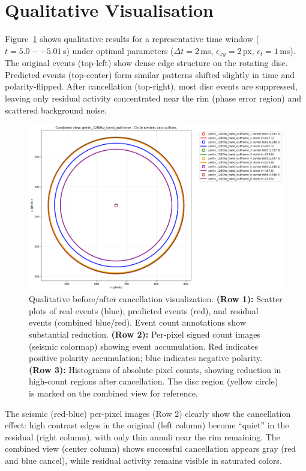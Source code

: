 \section{Qualitative Visualisation}

Figure~\ref{fig:before_after} shows qualitative results for a representative time window ($t=5.0--5.01$\,s) under optimal parameters ($\Delta t=2$\,ms, $\epsilon_{xy}=2$\,px, $\epsilon_t=1$\,ms). The original events (top-left) show dense edge structure on the rotating disc. Predicted events (top-center) form similar patterns shifted slightly in time and polarity-flipped. After cancellation (top-right), most disc events are suppressed, leaving only residual activity concentrated near the rim (phase error region) and scattered background noise.

\begin{figure}[t]
  \centering
  \includegraphics[width=0.95\linewidth]{../code/pipeline/results_plots/perlin_1280hz_hand_outframe_combined_circles.png}
  \caption{Qualitative before/after cancellation visualization. \textbf{(Row 1):} Scatter plots of real events (blue), predicted events (red), and residual events (combined blue/red). Event count annotations show substantial reduction. \textbf{(Row 2):} Per-pixel signed count images (seismic colormap) showing event accumulation. Red indicates positive polarity accumulation; blue indicates negative polarity. \textbf{(Row 3):} Histograms of absolute pixel counts, showing reduction in high-count regions after cancellation. The disc region (yellow circle) is marked on the combined view for reference.}
  \label{fig:before_after}
\end{figure}

The seismic (red-blue) per-pixel images (Row 2) clearly show the cancellation effect: high contrast edges in the original (left column) become ``quiet'' in the residual (right column), with only thin annuli near the rim remaining. The combined view (center column) shows successful cancellation appears gray (red and blue cancel), while residual activity remains visible in saturated colors.

